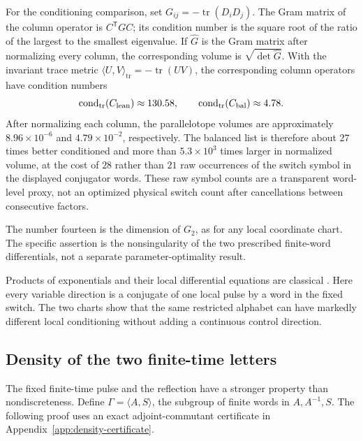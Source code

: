 \documentclass[11pt,a4paper]{article}
\begin{document}
For the conditioning comparison, set $G_{ij}=-\operatorname{tr}(D_iD_j)$.
The Gram matrix of the column operator is $C^{\mathsf T}GC$; its condition
number is the square root of the ratio of the largest to the smallest
eigenvalue.  If $\widehat G$ is the Gram matrix after normalizing every
column, the corresponding volume is $\sqrt{\det\widehat G}$.
With the invariant trace metric $\langle U,V\rangle_{\mathrm{tr}}=-\operatorname{tr}(UV)$, the corresponding column operators have condition numbers
\[
\operatorname{cond}_{\rm tr}(C_{\rm lean})\approx130.58,
\qquad
\operatorname{cond}_{\rm tr}(C_{\rm bal})\approx4.78.
\]
After normalizing each column, the parallelotope volumes are approximately $8.96\times10^{-6}$ and $4.79\times10^{-2}$, respectively.  The balanced list is therefore about $27$ times better conditioned and more than $5.3\times10^3$ times larger in normalized volume, at the cost of $28$ rather than $21$ raw occurrences of the switch symbol in the displayed conjugator words.  These raw symbol counts are a transparent word-level proxy, not an optimized physical switch count after cancellations between consecutive factors.


The number fourteen is the dimension of $G_2$, as for any local coordinate chart.  The specific assertion is the nonsingularity of the two prescribed finite-word differentials, not a separate parameter-optimality result.


Products of exponentials and their local differential equations are classical \cite{WeiNorman1964,Altafini2003}.  Here every variable direction is a conjugate of one local pulse by a word in the fixed switch.  The two charts show that the same restricted alphabet can have markedly different local conditioning without adding a continuous control direction.


\subsection{Density of the two finite-time letters}
The fixed finite-time pulse and the reflection have a stronger property than nondiscreteness.
Define $\Gamma=\langle A,S\rangle$, the subgroup of finite words in $A,A^{-1},S$.
The following proof uses an exact adjoint-commutant certificate in Appendix~\ref{app:density-certificate}.
\end{document}

